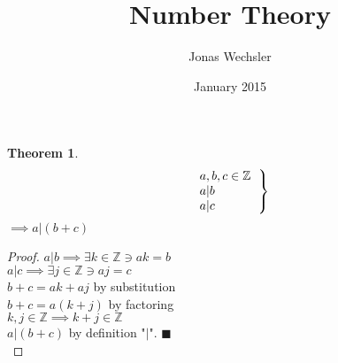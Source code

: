 \documentclass{article}
\title{Number Theory \phone}
\author{Jonas Wechsler}
\date{January 2015}
\newtheorem{theorem}{Theorem}[section]
\begin{document}
	\maketitle
	\begin{theorem}
		\[ \left .
			\begin{tabular}{l}
				$a,b,c \in \mathbb{Z}$\\
				$a | b$\\
				$a | c$\\
			\end{tabular}
		\right \} \]
	$\implies a|(b+c)$\\
\end{theorem}
\begin{proof}
	$a|b \implies \exists k \in \mathbb{Z} \ni ak = b$\\
	$a|c \implies \exists j \in \mathbb{Z} \ni aj = c$\\
	$b+c=ak+aj$ by substitution\\
	$b+c=a(k+j)$ by factoring\\
	$k,j \in \mathbb{Z} \implies k+j \in \mathbb{Z}$\\
	$a|(b+c)$ by definition "$|$". $\blacksquare$ \\
\end{proof}
\end{document}
